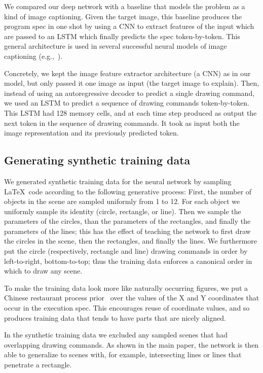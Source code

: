 \documentclass{article}
\begin{document}
We  compared our deep network with a baseline that models the problem as a kind of image captioning.
Given the target image, this baseline produces the program spec in one shot by
using a CNN to extract features of the input which are passed to an LSTM which finally predicts
the spec token-by-token.
This general architecture is used in several successful neural models of image captioning (e.g.,~\cite{vinyals2015show}).

Concretely, we kept the image feature extractor architecture (a CNN) as in our model,
but only passed it one image as input (the target image to explain).
Then, instead of using an autoregressive decoder to predict a single drawing command,
we used an LSTM to predict a sequence of drawing commands token-by-token.
This LSTM had 128 memory cells,
and at each time step produced as output the next token in the sequence of drawing commands.
It took as input both the image representation and its previously predicted token.

\subsection{Generating synthetic training data}

We generated synthetic training data for the neural network by
sampling \LaTeX~code according to the following generative process:
First,
the number of objects in the scene are sampled uniformly from 1 to 12.
For each object we uniformly sample its identity (circle, rectangle, or line).
Then we sample the parameters of the circles,
than the parameters of the rectangles,
and finally the parameters of the lines;
this has the effect of teaching the network to first draw the circles in the scene,
then the rectangles,
and finally the lines.
We furthermore put the circle (respectively, rectangle and line) drawing commands in order by
left-to-right, bottom-to-top;
thus the training data enforces a canonical order in which to draw any scene.

To make the training data look more like naturally occurring figures,
we put a Chinese restaurant process prior~\cite{gershman2012tutorial} over
the values of the X and Y coordinates that occur in the execution spec.
This encourages reuse of coordinate values,
and so produces training data that tends to have parts that are nicely aligned.

In the synthetic training data we excluded any sampled scenes that had
overlapping drawing commands.  As shown in the main paper, the network
is then able to generalize to scenes with, for example, intersecting
lines or lines that penetrate a rectangle.
\end{document}
